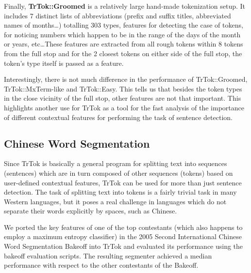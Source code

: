 Finally, \textbf{TrTok::Groomed} is a relatively large hand-made
tokenization setup. It includes 7 distinct lists of abbreviations
(prefix and suffix titles, abbreviated names of months\ldots)
totalling 303 types, features for detecting the case of tokens, for
noticing numbers which happen to be in the range of the days of the
month or years, etc\ldots These features are extracted from all rough
tokens within 8 tokens from the full stop and for the 2 closest tokens
on either side of the full stop, the token's type itself is passed as
a feature.

Interestingly, there is not much difference in the performance of
TrTok::Groomed, TrTok::MxTerm-like and TrTok::Easy. This tells us that
besides the token types in the close vicinity of the full stop, other
features are not that important. This highlights another use for TrTok
as a tool for the fast analysis of the importance of different
contextual features for performing the task of sentence detection.

\subsection{Chinese Word Segmentation}

Since TrTok is basically a general program for splitting text into
sequences (sentences) which are in turn composed of other sequences
(tokens) based on user-defined contextual features, TrTok can be used
for more than just sentence detection. The task of splitting text into
tokens is a fairly trivial task in many Western languages, but it
poses a real challenge in languages which do not separate their words
explicitly by spaces, such as Chinese.

We ported the key features of one of the top contestants (which also
happens to employ a maximum entropy classifier)
\cite{seg-chinese-maxent} in the 2005 Second International Chinese
Word Segmentation Bakeoff into TrTok and evaluated its performance
using the bakeoff evaluation scripts. The resulting segmenter achieved
a median performance with respect to the other contestants of the
Bakeoff.
